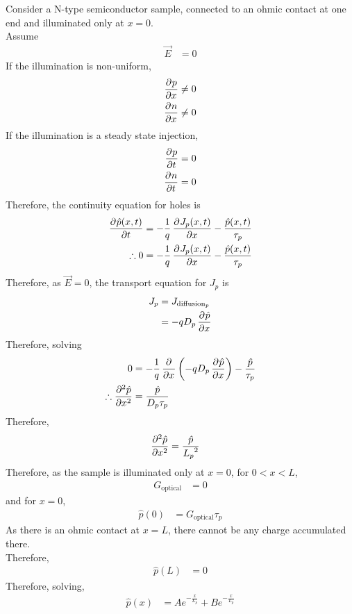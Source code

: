 \documentclass[titlepage, fleqn, a4paper, 12pt, twoside]{article}
\theoremstyle{definition}
\theoremstyle{theorem}
\begin{document}
Consider a N-type semiconductor sample, connected to an ohmic contact at one end and illuminated only at $x = 0$.\\
Assume
\begin{align*}
	\overrightarrow{E} &= 0
\end{align*}
If the illumination is non-uniform,
\begin{align*}
	\dpd{p}{x} &\neq 0\\
	\dpd{n}{x} &\neq 0
\end{align*}
If the illumination is a steady state injection,
\begin{align*}
	\dpd{p}{t} &= 0\\
	\dpd{n}{t} &= 0
\end{align*}
Therefore, the continuity equation for holes is
\begin{align*}
	\dpd{\hat{p}(x,t)}{t} &= -\frac{1}{q} \dpd{J_p(x,t)}{x} - \frac{\hat{p}(x,t)}{\tau_p}\\
	\therefore 0 &= -\frac{1}{q} \dpd{J_p(x,t)}{x} - \frac{\hat{p}(x,t)}{\tau_p}
\end{align*}
Therefore, as $\overrightarrow{E} = 0$, the transport equation for $J_p$ is
\begin{align*}
	J_p &= J_{\text{diffusion}_p}\\
	&= -q D_p \dpd{\hat{p}}{x}
\end{align*}
Therefore, solving
\begin{align*}
	0 &= -\frac{1}{q} \dpd{}{x}\left( -q D_p \dpd{\hat{p}}{x} \right) - \frac{\hat{p}}{\tau_p}\\
	\therefore \dpd[2]{\hat{p}}{x} &= \frac{\hat{p}}{D_p \tau_p}
\end{align*}
Therefore,
\begin{align*}
	\dpd[2]{\hat{p}}{x} &= \frac{\hat{p}}{{L_p}^2}
\end{align*}
Therefore, as the sample is illuminated only at $x = 0$, for $0 < x < L$,
\begin{align*}
	G_{\text{optical}} &= 0
\end{align*}
and for $x = 0$,
\begin{align*}
	\hat{p}(0) &= G_{\text{optical}} \tau_p
\end{align*}
As there is an ohmic contact at $x = L$, there cannot be any charge accumulated there.\\
Therefore,
\begin{align*}
	\hat{p}(L) &= 0
\end{align*}
Therefore, solving,
\begin{align*}
	\hat{p}(x) &= A e^{-\frac{x}{L_p}} + B e^{-\frac{x}{L_p}}
\end{align*}
\end{document}
